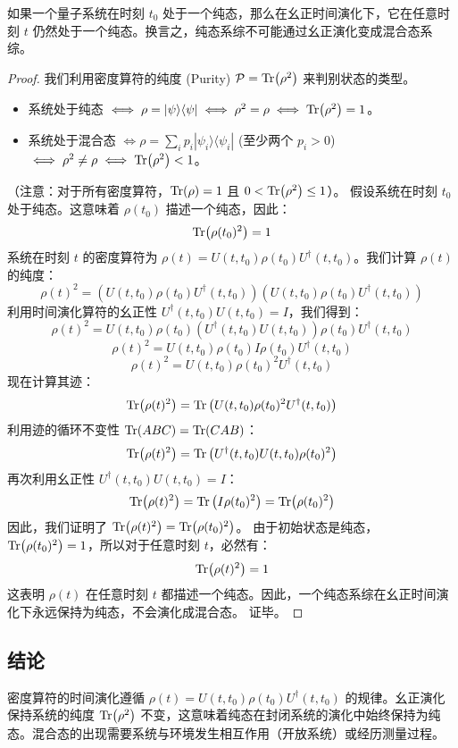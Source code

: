 \documentclass[12pt, a4paper]{article}
\begin{document}
如果一个量子系统在时刻 \(t_0\) 处于一个纯态，那么在幺正时间演化下，它在任意时刻 \(t\) 仍然处于一个纯态。换言之，纯态系综不可能通过幺正演化变成混合态系综。

\begin{proof}
我们利用密度算符的纯度 (Purity) \(\mathcal{P} = \Tr(\rho^2)\) 来判别状态的类型。
\begin{itemize}
    \item 系统处于纯态 \(\iff \rho = |\psi\rangle\langle\psi| \iff \rho^2 = \rho \iff \Tr(\rho^2) = 1\)。
    \item 系统处于混合态 \(\iff \rho = \sum_i p_i |\psi_i\rangle\langle\psi_i|\) (至少两个 \(p_i > 0\)) \(\iff \rho^2 \neq \rho \iff \Tr(\rho^2) < 1\)。
\end{itemize}
（注意：对于所有密度算符，\(\Tr(\rho) = 1\) 且 \(0 < \Tr(\rho^2) \le 1\)）。
假设系统在时刻 \(t_0\) 处于纯态。这意味着 \(\rho(t_0)\) 描述一个纯态，因此：
\[
\Tr(\rho(t_0)^2) = 1
\]
系统在时刻 \(t\) 的密度算符为 \(\rho(t) = U(t, t_0) \rho(t_0) U^\dagger(t, t_0)\)。我们计算 \(\rho(t)\) 的纯度：
\[
\rho(t)^2 = \left( U(t, t_0) \rho(t_0) U^\dagger(t, t_0) \right) \left( U(t, t_0) \rho(t_0) U^\dagger(t, t_0) \right)
\]
利用时间演化算符的幺正性 \(U^\dagger(t, t_0) U(t, t_0) = I\)，我们得到：
\[
\rho(t)^2 = U(t, t_0) \rho(t_0) (U^\dagger(t, t_0) U(t, t_0)) \rho(t_0) U^\dagger(t, t_0)
\]
\[
\rho(t)^2 = U(t, t_0) \rho(t_0) I \rho(t_0) U^\dagger(t, t_0)
\]
\[
\rho(t)^2 = U(t, t_0) \rho(t_0)^2 U^\dagger(t, t_0)
\]
现在计算其迹：
\[
\Tr(\rho(t)^2) = \Tr\left( U(t, t_0) \rho(t_0)^2 U^\dagger(t, t_0) \right)
\]
利用迹的循环不变性 \(\Tr(ABC) = \Tr(CAB)\)：
\[
\Tr(\rho(t)^2) = \Tr\left( U^\dagger(t, t_0) U(t, t_0) \rho(t_0)^2 \right)
\]
再次利用幺正性 \(U^\dagger(t, t_0) U(t, t_0) = I\)：
\[
\Tr(\rho(t)^2) = \Tr\left( I \rho(t_0)^2 \right) = \Tr(\rho(t_0)^2)
\]
因此，我们证明了 \(\Tr(\rho(t)^2) = \Tr(\rho(t_0)^2)\)。
由于初始状态是纯态，\(\Tr(\rho(t_0)^2) = 1\)，所以对于任意时刻 \(t\)，必然有：
\[
\Tr(\rho(t)^2) = 1
\]
这表明 \(\rho(t)\) 在任意时刻 \(t\) 都描述一个纯态。因此，一个纯态系综在幺正时间演化下永远保持为纯态，不会演化成混合态。
证毕。
\end{proof}
\subsection*{结论}
密度算符的时间演化遵循 \(\rho(t) = U(t, t_0) \rho(t_0) U^\dagger(t, t_0)\) 的规律。幺正演化保持系统的纯度 \(\Tr(\rho^2)\) 不变，这意味着纯态在封闭系统的演化中始终保持为纯态。混合态的出现需要系统与环境发生相互作用（开放系统）或经历测量过程。
\end{document}
